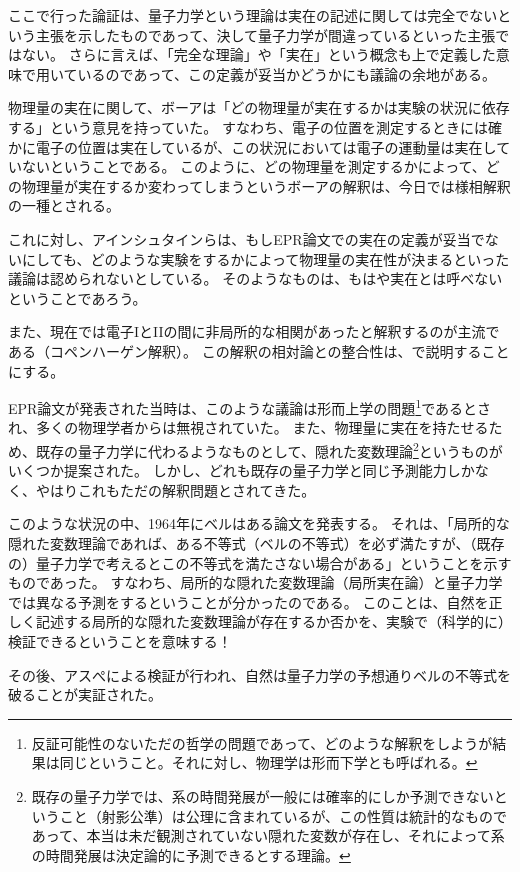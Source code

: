\documentclass[10pt,b5paper,papersize,dvipdfmx]{jsbook}
\begin{document}
ここで行った論証は、量子力学という理論は実在の記述に関しては完全でないという主張を示したものであって、決して量子力学が間違っているといった主張ではない。
さらに言えば、「完全な理論」や「実在」という概念も上で定義した意味で用いているのであって、この定義が妥当かどうかにも議論の余地がある。\par
物理量の実在に関して、ボーアは「どの物理量が実在するかは実験の状況に依存する」という意見を持っていた。
すなわち、電子の位置を測定するときには確かに電子の位置は実在しているが、この状況においては電子の運動量は実在していないということである。
このように、どの物理量を測定するかによって、どの物理量が実在するか変わってしまうというボーアの解釈は、今日では様相解釈の一種とされる。\par
これに対し、アインシュタインらは、もしEPR論文での実在の定義が妥当でないにしても、どのような実験をするかによって物理量の実在性が決まるといった議論は認められないとしている。
そのようなものは、もはや実在とは呼べないということであろう。\par
また、現在では電子IとIIの間に非局所的な相関があったと解釈するのが主流である（コペンハーゲン解釈）。
この解釈の相対論との整合性は、で説明することにする。\par
EPR論文が発表された当時は、このような議論は形而上学の問題\footnote{
  反証可能性のないただの哲学の問題であって、どのような解釈をしようが結果は同じということ。それに対し、物理学は形而下学とも呼ばれる。
}であるとされ、多くの物理学者からは無視されていた。
また、物理量に実在を持たせるため、既存の量子力学に代わるようなものとして、隠れた変数理論\footnote{
  既存の量子力学では、系の時間発展が一般には確率的にしか予測できないということ（射影公準）は公理に含まれているが、この性質は統計的なものであって、本当は未だ観測されていない隠れた変数が存在し、それによって系の時間発展は決定論的に予測できるとする理論。
}というものがいくつか提案された。
しかし、どれも既存の量子力学と同じ予測能力しかなく、やはりこれもただの解釈問題とされてきた。\par
このような状況の中、1964年にベルはある論文を発表する。
それは、「局所的な隠れた変数理論であれば、ある不等式（ベルの不等式）を必ず満たすが、（既存の）量子力学で考えるとこの不等式を満たさない場合がある」ということを示すものであった。
すなわち、局所的な隠れた変数理論（局所実在論）と量子力学では異なる予測をするということが分かったのである。
このことは、自然を正しく記述する局所的な隠れた変数理論が存在するか否かを、実験で（科学的に）検証できるということを意味する！ \par
その後、アスぺによる検証が行われ、自然は量子力学の予想通りベルの不等式を破ることが実証された。
\end{document}
